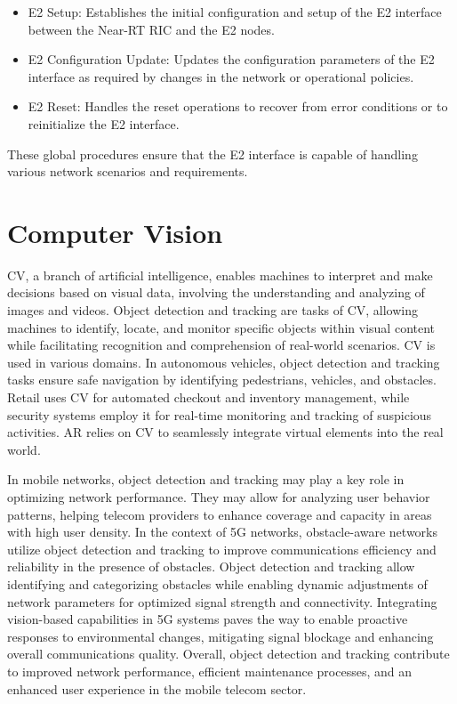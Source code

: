 \begin{itemize}
\item E2 Setup: Establishes the initial configuration and setup of the E2 interface between the Near-RT RIC and the E2 nodes.
\item E2 Configuration Update: Updates the configuration parameters of the E2 interface as required by changes in the network or operational policies.
\item E2 Reset: Handles the reset operations to recover from error conditions or to reinitialize the E2 interface.
\end{itemize}
These global procedures ensure that the E2 interface is capable of handling various network scenarios and requirements.



\section{Computer Vision}\label{sec:CV}

CV, a branch of artificial intelligence, enables machines to interpret and make decisions based on visual data, involving the understanding and analyzing of images and videos.
Object detection and tracking are tasks of CV, allowing machines to identify, locate, and monitor specific objects within visual content while facilitating recognition and comprehension of real-world scenarios.
CV is used in various domains.
In autonomous vehicles, object detection and tracking tasks ensure safe navigation by identifying pedestrians, vehicles, and obstacles.
Retail uses CV for automated checkout and inventory management, while security systems employ it for real-time monitoring and tracking of suspicious activities.
AR relies on CV to seamlessly integrate virtual elements into the real world.

In mobile networks, object detection and tracking may play a key role in optimizing network performance.
They may allow for analyzing user behavior patterns, helping telecom providers to enhance coverage and capacity in areas with high user density.
In the context of 5G networks, obstacle-aware networks utilize object detection and tracking to improve communications efficiency and reliability in the presence of obstacles.
Object detection and tracking allow identifying and categorizing obstacles while enabling dynamic adjustments of network parameters for optimized signal strength and connectivity.
Integrating vision-based capabilities in 5G systems paves the way to enable proactive responses to environmental changes, mitigating signal blockage and enhancing overall communications quality.
Overall, object detection and tracking contribute to improved network performance, efficient maintenance processes, and an enhanced user experience in the mobile telecom sector.

